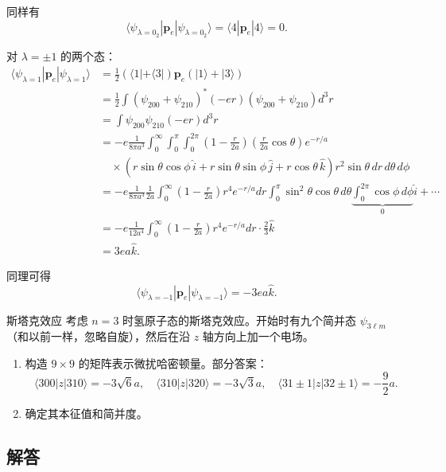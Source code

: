 同样有
\[
\langle \psi_{\lambda=0_2} | \mathbf{p}_e | \psi_{\lambda=0_2} \rangle = \langle 4 | \mathbf{p}_e | 4 \rangle = 0.
\]

对 $\lambda = \pm 1$ 的两个态：
\begin{align*}
	\langle \psi_{\lambda=1} | \mathbf{p}_e | \psi_{\lambda=1} \rangle &= \frac{1}{2} (\langle 1| + \langle 3|) \mathbf{p}_e (|1\rangle + |3\rangle) \\
	&= \frac{1}{2} \int (\psi_{200} + \psi_{210})^*(-er)(\psi_{200} + \psi_{210}) d^3r \\
	&= \int \psi_{200} \psi_{210} (-er) d^3r \\
	&= -e \frac{1}{8\pi a^3} \int_0^\infty \int_0^\pi \int_0^{2\pi} \left(1 - \frac{r}{2a}\right) \left(\frac{r}{2a} \cos\theta\right) e^{-r/a} \\
	&\quad \times (r\sin\theta\cos\phi\,\hat{i} + r\sin\theta\sin\phi\,\hat{j} + r\cos\theta\,\hat{k}) r^2 \sin\theta\,dr\,d\theta\,d\phi \\
	&= -e \frac{1}{8\pi a^3} \frac{1}{2a} \int_0^\infty \left(1 - \frac{r}{2a}\right) r^4 e^{-r/a} dr \int_0^\pi \sin^2\theta \cos\theta\,d\theta \underbrace{\int_0^{2\pi} \cos\phi\,d\phi}_{0} \hat{i} + \cdots \\
	&= -e \frac{1}{12a^4} \int_0^\infty \left(1 - \frac{r}{2a}\right) r^4 e^{-r/a} dr \cdot \frac{2}{3} \hat{k} \\
	&= 3ea \hat{k}.
\end{align*}

同理可得
\[
\langle \psi_{\lambda=-1} | \mathbf{p}_e | \psi_{\lambda=-1} \rangle = -3ea \hat{k}.
\]
\newpage
\begin{problembox}{斯塔克效应}
	考虑 $n=3$ 时氢原子态的斯塔克效应。开始时有九个简并态 $\psi_{3\ell m}$（和以前一样，忽略自旋），然后在沿 $z$ 轴方向上加一个电场。
	
	\begin{enumerate}
		\item 构造 $9\times9$ 的矩阵表示微扰哈密顿量。部分答案：
		\[
		\langle 300 | z | 310 \rangle = -3\sqrt{6}a, \quad
		\langle 310 | z | 320 \rangle = -3\sqrt{3}a, \quad
		\langle 31\pm1 | z | 32\pm1 \rangle = -\frac{9}{2}a.
		\]
		
		\item 确定其本征值和简并度。
	\end{enumerate}
\end{problembox}


\subsection*{解答}

